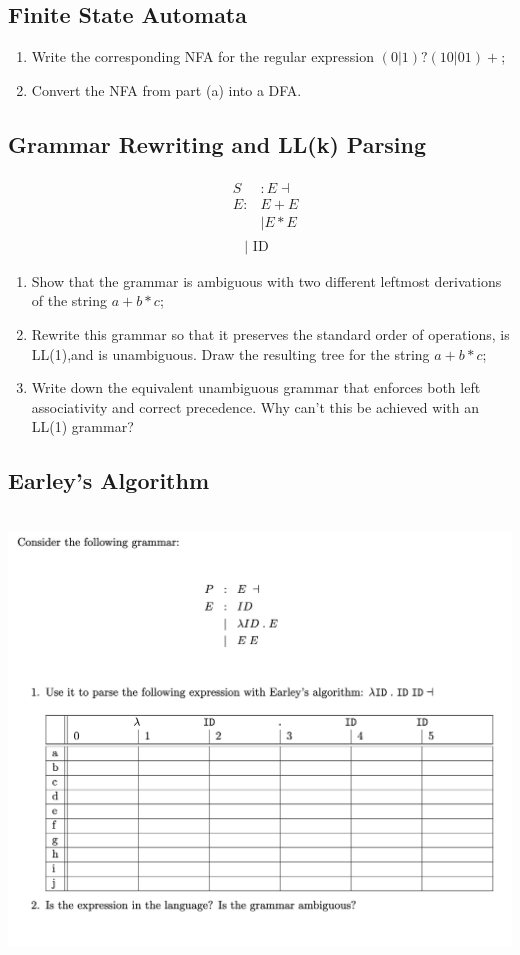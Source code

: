 \documentclass[a4paper]{article}
\theoremstyle{definition}
\begin{document}
  \subsection{Finite State Automata}
  \begin{enumerate}
    \item Write the corresponding NFA for the regular expression $(0|1)?(10|01)+$;
    \item Convert the NFA from part (a) into a DFA.
  \end{enumerate}
  
  \subsection{Grammar Rewriting and LL(k) Parsing}
  $$
\begin{aligned}
&\begin{aligned}
S &: E \dashv \\
E: & E+E \\
& \mid E * E
\end{aligned}\\
&\quad 
 \ \mid \text { ID }
\end{aligned}
$$
  \begin{enumerate}
    \item Show that the grammar is ambiguous with two different leftmost derivations of the string $a+b*c$;
    \item Rewrite this grammar so that it preserves the standard order of operations, is LL(1),and is unambiguous.  Draw the resulting tree for the string $a+b*c$;
    \item Write down the equivalent unambiguous grammar that enforces both left associativity and correct precedence.  Why can’t this be achieved with an LL(1) grammar?
  \end{enumerate}

  \subsection{Earley’s Algorithm}

  \begin{center}
    \includegraphics[height=12cm]{img/Snipaste_2021-04-12_17-39-39.png}
    \end{center}
    
\end{document}
